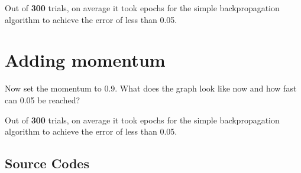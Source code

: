 \documentclass[a4paper,12pt]{article}
\begin{document}
Out of \textbf{300} trials, on average it took \textbf{} epochs for the simple backpropagation algorithm to achieve the error of less than 0.05. 

\section{Adding momentum}
Now set the momentum to 0.9. What does the graph look like now and how fast can 0.05 be reached?


\begin{center}


\end{center}

Out of \textbf{300} trials, on average it took \textbf{} epochs for the simple backpropagation algorithm to achieve the error of less than 0.05. 


\begin{appendices}
\section{Source Codes}
    
\end{appendices}
\end{document}

